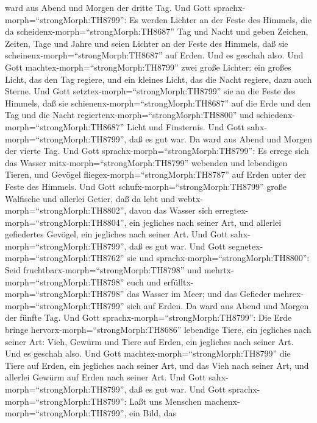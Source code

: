 ward aus Abend und Morgen der dritte Tag.  Und Gott
sprachx-morph=``strongMorph:TH8799'': Es werden Lichter an der Feste des
Himmels, die da scheidenx-morph=``strongMorph:TH8687'' Tag und Nacht und
geben Zeichen, Zeiten, Tage und Jahre  und seien Lichter an
der Feste des Himmels, daß sie scheinenx-morph=``strongMorph:TH8687''
auf Erden. Und es geschah also.  Und Gott
machtex-morph=``strongMorph:TH8799'' zwei große Lichter: ein großes
Licht, das den Tag regiere, und ein kleines Licht, das die Nacht
regiere, dazu auch Sterne.  Und Gott
setztex-morph=``strongMorph:TH8799'' sie an die Feste des Himmels, daß
sie schienenx-morph=``strongMorph:TH8687'' auf die Erde 
und den Tag und die Nacht regiertenx-morph=``strongMorph:TH8800'' und
schiedenx-morph=``strongMorph:TH8687'' Licht und Finsternis. Und Gott
sahx-morph=``strongMorph:TH8799'', daß es gut war.  Da ward
aus Abend und Morgen der vierte Tag.  Und Gott
sprachx-morph=``strongMorph:TH8799'': Es errege sich das Wasser
mitx-morph=``strongMorph:TH8799'' webenden und lebendigen Tieren, und
Gevögel fliegex-morph=``strongMorph:TH8787'' auf Erden unter der Feste
des Himmels.  Und Gott schufx-morph=``strongMorph:TH8799''
große Walfische und allerlei Getier, daß da lebt und
webtx-morph=``strongMorph:TH8802'', davon das Wasser sich
erregtex-morph=``strongMorph:TH8804'', ein jegliches nach seiner Art,
und allerlei gefiedertes Gevögel, ein jegliches nach seiner Art. Und
Gott sahx-morph=``strongMorph:TH8799'', daß es gut war. 
Und Gott segnetex-morph=``strongMorph:TH8762'' sie und
sprachx-morph=``strongMorph:TH8800'': Seid
fruchtbarx-morph=``strongMorph:TH8798'' und
mehrtx-morph=``strongMorph:TH8798'' euch und
erfülltx-morph=``strongMorph:TH8798'' das Wasser im Meer; und das
Gefieder mehrex-morph=``strongMorph:TH8799'' sich auf Erden.
 Da ward aus Abend und Morgen der fünfte Tag. 
Und Gott sprachx-morph=``strongMorph:TH8799'': Die Erde bringe
hervorx-morph=``strongMorph:TH8686'' lebendige Tiere, ein jegliches nach
seiner Art: Vieh, Gewürm und Tiere auf Erden, ein jegliches nach seiner
Art. Und es geschah also.  Und Gott
machtex-morph=``strongMorph:TH8799'' die Tiere auf Erden, ein jegliches
nach seiner Art, und das Vieh nach seiner Art, und allerlei Gewürm auf
Erden nach seiner Art. Und Gott sahx-morph=``strongMorph:TH8799'', daß
es gut war.  Und Gott sprachx-morph=``strongMorph:TH8799'':
Laßt uns Menschen machenx-morph=``strongMorph:TH8799'', ein Bild, das
